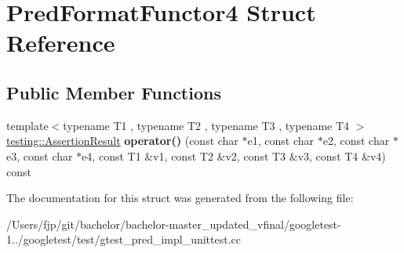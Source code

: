 \hypertarget{struct_pred_format_functor4}{}\section{Pred\+Format\+Functor4 Struct Reference}
\label{struct_pred_format_functor4}
\subsection*{Public Member Functions}
\begin{DoxyCompactItemize}
\item 
\mbox{\label{struct_pred_format_functor4_a97061d2b9eadf357f4e50a75f5a9af5b}} 
{\footnotesize template$<$typename T1 , typename T2 , typename T3 , typename T4 $>$ }\\\mbox{\hyperlink{classtesting_1_1_assertion_result}{testing\+::\+Assertion\+Result}} {\bfseries operator()} (const char $\ast$e1, const char $\ast$e2, const char $\ast$e3, const char $\ast$e4, const T1 \&v1, const T2 \&v2, const T3 \&v3, const T4 \&v4) const
\end{DoxyCompactItemize}


The documentation for this struct was generated from the following file\+:\begin{DoxyCompactItemize}
\item 
/\+Users/fjp/git/bachelor/bachelor-\/master\+\_\+updated\+\_\+vfinal/googletest-\/1../googletest/test/gtest\+\_\+pred\+\_\+impl\+\_\+unittest.\+cc\end{DoxyCompactItemize}
